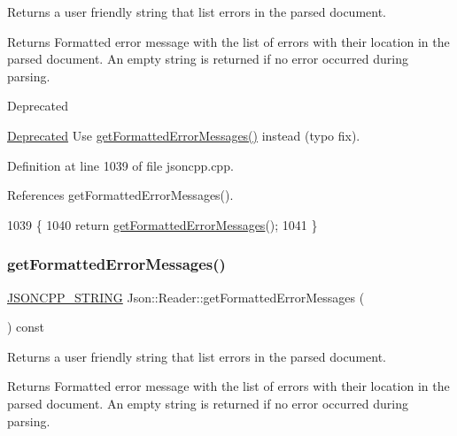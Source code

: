 Returns a user friendly string that list errors in the parsed document. 

\begin{DoxyReturn}{Returns}
Formatted error message with the list of errors with their location in the parsed document. An empty string is returned if no error occurred during parsing. 
\end{DoxyReturn}
\begin{DoxyRefDesc}{Deprecated}
\item[\hyperlink{deprecated__deprecated000006}{Deprecated}]Use \hyperlink{class_json_1_1_reader_ae638a7b1f36f7ccf99ba89fa36ccf222}{get\+Formatted\+Error\+Messages()} instead (typo fix). \end{DoxyRefDesc}


Definition at line 1039 of file jsoncpp.\+cpp.



References get\+Formatted\+Error\+Messages().


\begin{DoxyCode}
1039                                                       \{
1040   \textcolor{keywordflow}{return} \hyperlink{class_json_1_1_reader_ae638a7b1f36f7ccf99ba89fa36ccf222}{getFormattedErrorMessages}();
1041 \}
\end{DoxyCode}
\mbox{\label{class_json_1_1_reader_ae638a7b1f36f7ccf99ba89fa36ccf222}} 
\subsubsection{\texorpdfstring{get\+Formatted\+Error\+Messages()}{getFormattedErrorMessages()}}
{\footnotesize\ttfamily \hyperlink{json_8h_a1e723f95759de062585bc4a8fd3fa4be}{J\+S\+O\+N\+C\+P\+P\+\_\+\+S\+T\+R\+I\+NG} Json\+::\+Reader\+::get\+Formatted\+Error\+Messages (\begin{DoxyParamCaption}{ }\end{DoxyParamCaption}) const}



Returns a user friendly string that list errors in the parsed document. 

\begin{DoxyReturn}{Returns}
Formatted error message with the list of errors with their location in the parsed document. An empty string is returned if no error occurred during parsing. 
\end{DoxyReturn}


